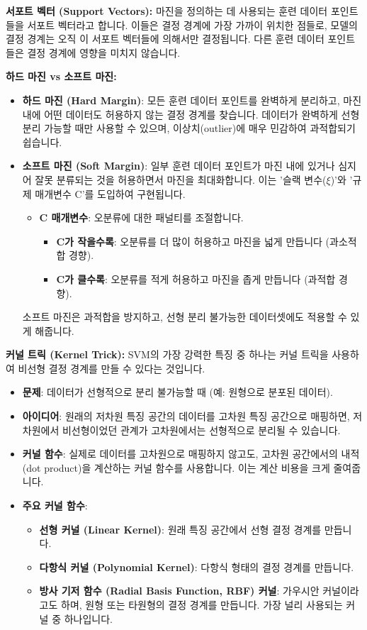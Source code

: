 \documentclass[11pt,a4paper]{article}
\begin{document}
\textbf{서포트 벡터 (Support Vectors):}
마진을 정의하는 데 사용되는 훈련 데이터 포인트들을 서포트 벡터라고 합니다. 이들은 결정 경계에 가장 가까이 위치한 점들로, 모델의 결정 경계는 오직 이 서포트 벡터들에 의해서만 결정됩니다. 다른 훈련 데이터 포인트들은 결정 경계에 영향을 미치지 않습니다.

\textbf{하드 마진 vs 소프트 마진:}
\begin{itemize}
    \item \textbf{하드 마진 (Hard Margin)}: 모든 훈련 데이터 포인트를 완벽하게 분리하고, 마진 내에 어떤 데이터도 허용하지 않는 결정 경계를 찾습니다. 데이터가 완벽하게 선형 분리 가능할 때만 사용할 수 있으며, 이상치(outlier)에 매우 민감하여 과적합되기 쉽습니다.
    \item \textbf{소프트 마진 (Soft Margin)}: 일부 훈련 데이터 포인트가 마진 내에 있거나 심지어 잘못 분류되는 것을 허용하면서 마진을 최대화합니다. 이는 '슬랙 변수($\xi$)'와 '규제 매개변수 C'를 도입하여 구현됩니다.
        \begin{itemize}
            \item \textbf{C 매개변수}: 오분류에 대한 패널티를 조절합니다.
            \begin{itemize}
                \item \textbf{C가 작을수록}: 오분류를 더 많이 허용하고 마진을 넓게 만듭니다 (과소적합 경향).
                \item \textbf{C가 클수록}: 오분류를 적게 허용하고 마진을 좁게 만듭니다 (과적합 경향).
            \end{itemize}
        \end{itemize}
    소프트 마진은 과적합을 방지하고, 선형 분리 불가능한 데이터셋에도 적용할 수 있게 해줍니다.
\end{itemize}

\textbf{커널 트릭 (Kernel Trick):}
SVM의 가장 강력한 특징 중 하나는 커널 트릭을 사용하여 비선형 결정 경계를 만들 수 있다는 것입니다.
\begin{itemize}
    \item \textbf{문제}: 데이터가 선형적으로 분리 불가능할 때 (예: 원형으로 분포된 데이터).
    \item \textbf{아이디어}: 원래의 저차원 특징 공간의 데이터를 고차원 특징 공간으로 매핑하면, 저차원에서 비선형이었던 관계가 고차원에서는 선형적으로 분리될 수 있습니다.
    \item \textbf{커널 함수}: 실제로 데이터를 고차원으로 매핑하지 않고도, 고차원 공간에서의 내적(dot product)을 계산하는 커널 함수를 사용합니다. 이는 계산 비용을 크게 줄여줍니다.
    \item \textbf{주요 커널 함수}:
        \begin{itemize}
            \item \textbf{선형 커널 (Linear Kernel)}: 원래 특징 공간에서 선형 결정 경계를 만듭니다.
            \item \textbf{다항식 커널 (Polynomial Kernel)}: 다항식 형태의 결정 경계를 만듭니다.
            \item \textbf{방사 기저 함수 (Radial Basis Function, RBF) 커널}: 가우시안 커널이라고도 하며, 원형 또는 타원형의 결정 경계를 만듭니다. 가장 널리 사용되는 커널 중 하나입니다.
        \end{itemize}
\end{itemize}
\end{document}
